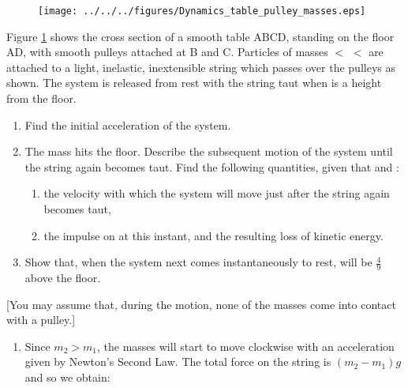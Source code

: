
\begin{problem}[A1969AMIIQ2a] %
{\begin{figure}[h]
\centering
\texttt{[image: ../../../figures/Dynamics\_table\_pulley\_masses.eps]}
\caption{}\label{fig:Dynamics_table_pulley_masses}
\end{figure}

Figure \ref{fig:Dynamics_table_pulley_masses} shows the cross section of a smooth table ABCD, standing on the floor AD, with smooth pulleys attached at B and C. Particles of masses  $<$  $<$  are attached to a light, inelastic, inextensible string which passes over the pulleys as shown. The system is released from rest with the string taut when  is a height  from the floor.
\begin{enumerate}
	\item Find the initial acceleration of the system.
	\item The mass  hits the floor. Describe the subsequent motion of the system until the string again becomes taut. Find the following quantities, given that    and :
	\begin{enumerate}
		\item the velocity with which the system will move just after the string again becomes taut,
		\item the impulse on  at this instant, and the resulting loss of kinetic energy.
	\end{enumerate}
	\item Show that, when the system next comes instantaneously to rest,  will be $\frac{4}{9}$ above the floor.
\end{enumerate}
[You may assume that, during the motion, none of the masses come into contact with a pulley.]
}
{}
{\begin{enumerate}
	\item Since $m_{2} > m_{1}$, the masses will start to move clockwise with an acceleration given by Newton's Second Law. The total force on the string is $(m_{2} - m_{1})g$ and so we obtain:

\end{enumerate}}
\end{problem}
